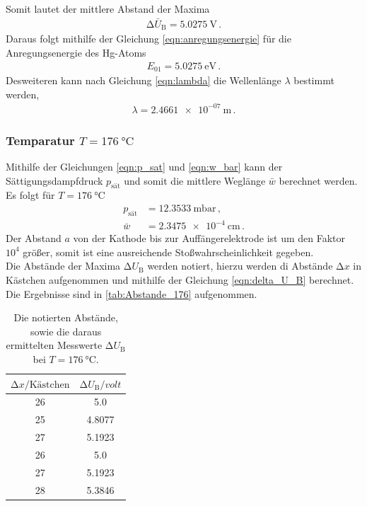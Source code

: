 \noindent
Somit lautet der mittlere Abstand der Maxima
\begin{align*}
    \increment \bar{U}_\text{B} = \SI{5.0275}{\volt} \, .
\end{align*}
\noindent
Daraus folgt mithilfe der Gleichung \eqref{eqn:anregungsenergie} für die Anregungsenergie des Hg-Atoms
\begin{align*}
    E_{01}=\SI{5.0275}{\electronvolt} \, .
\end{align*}
\noindent
Desweiteren kann nach Gleichung \eqref{eqn:lambda} die Wellenlänge $\lambda$ bestimmt werden,
\begin{align*}
    \lambda = \SI{2.4661e-07}{\metre} \, .
\end{align*}

\subsubsection{Temparatur $T = \SI{176}{\celsius}$}
Mithilfe der Gleichungen \eqref{eqn:p_sat} und \eqref{eqn:w_bar} kann der Sättigungsdampfdruck $p_\text{sät}$ und somit die mittlere Weglänge $\bar{w}$ berechnet werden.
Es folgt für $T = \SI{176}{\celsius}$
\begin{align*}
    p_\text{sät} &= \SI{12.3533}{\milli\bar} \, , \\
    \bar{w} &= \SI{2.3475e-4}{\centi\metre} \, .
\end{align*}
Der Abstand $a$ von der Kathode bis zur Auffängerelektrode ist um den Faktor $10^4$ größer, somit ist eine ausreichende Stoßwahrscheinlichkeit gegeben. \\

\noindent
Die Abstände der Maxima $\increment U_\text{B}$ werden notiert, hierzu  werden di Abstände $\increment x$ in Kästchen aufgenommen und mithilfe der Gleichung \eqref{eqn:delta_U_B} berechnet.
Die Ergebnisse sind in \autoref{tab:Abstande_176} aufgenommen.

\begin{table}
    \centering
    \caption{Die notierten Abstände, sowie die daraus ermittelten Messwerte $\increment U_\text{B}$ bei $T=\SI{176}{\celsius}$.} 
    \label{tab:Abstande_176}
    \begin{tabular}{c c}
    \toprule
     $\increment x /\text{Kästchen}$ & $\increment U_\text{B} / \si{volt}$\\
    \midrule
      26 &  5.0\\
      25 &  4.8077\\
      27 &  5.1923\\
      26 &  5.0\\
      27 &  5.1923\\
      28 &  5.3846\\
    \bottomrule
    \end{tabular}
\end{table}

